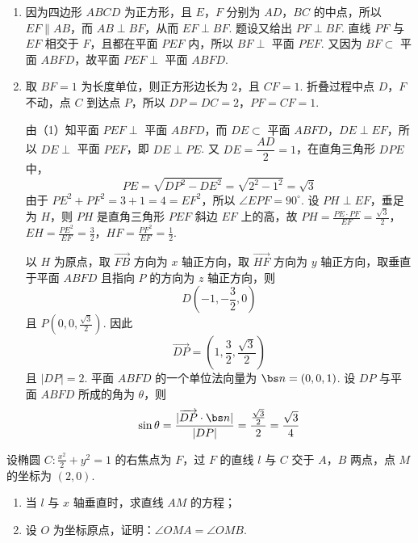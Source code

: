 \begin{solution}
\begin{enumerate}
\item 因为四边形 \(ABCD\) 为正方形，且 \(E\)，\(F\) 分别为 \(AD\)，\(BC\) 的中点，所以 \(EF\parallel AB\)，而 \(AB\perp BF\)，从而 \(EF\perp BF\). 题设又给出 \(PF\perp BF\). 直线 \(PF\) 与 \(EF\) 相交于 \(F\)，且都在平面 \(PEF\) 内，所以 \(BF\perp\) 平面 \(PEF\). 又因为 \(BF\subset\) 平面 \(ABFD\)，故平面 \(PEF\perp\) 平面 \(ABFD\).

\item 取 \(BF=1\) 为长度单位，则正方形边长为 \(2\)，且 \(CF=1\). 折叠过程中点 \(D\)，\(F\) 不动，点 \(C\) 到达点 \(P\)，所以 \(DP=DC=2\)，\(PF=CF=1\).

由（1）知平面 \(PEF\perp\) 平面 \(ABFD\)，而 \(DE\subset\) 平面 \(ABFD\)，\(DE\perp EF\)，所以 \(DE\perp\) 平面 \(PEF\)，即 \(DE\perp PE\). 又 \(DE=\dfrac{AD}{2}=1\)，在直角三角形 \(DPE\) 中，
\[
PE=\sqrt{DP^2-DE^2}=\sqrt{2^2-1^2}=\sqrt3
\]
由于 \(PE^2+PF^2=3+1=4=EF^2\)，所以 \(\angle EPF=90^\circ\). 设 \(PH\perp EF\)，垂足为 \(H\)，则 \(PH\) 是直角三角形 \(PEF\) 斜边 \(EF\) 上的高，故
\(PH=\frac{PE\cdot PF}{EF}=\frac{\sqrt3}{2}\)，\(EH=\frac{PE^2}{EF}=\frac32\)，\(HF=\frac{PF^2}{EF}=\frac12\).

以 \(H\) 为原点，取 \(\overrightarrow{FB}\) 方向为 \(x\) 轴正方向，取 \(\overrightarrow{HF}\) 方向为 \(y\) 轴正方向，取垂直于平面 \(ABFD\) 且指向 \(P\) 的方向为 \(z\) 轴正方向，则
\[
D\left(-1,-\frac32,0\right)
\]
且 \(P\left(0,0,\frac{\sqrt3}{2}\right)\). 因此
\[
\overrightarrow{DP}=\left(1,\frac32,\frac{\sqrt3}{2}\right)
\]
且 \(|DP|=2\).
平面 \(ABFD\) 的一个单位法向量为 \(\bs n=(0,0,1)\). 设 \(DP\) 与平面 \(ABFD\) 所成的角为 \(\theta\)，则
\[
\sin\theta=\frac{|\overrightarrow{DP}\cdot\bs n|}{|DP|}=\frac{\frac{\sqrt3}{2}}{2}=\frac{\sqrt3}{4}
\]
\end{enumerate}
\end{solution}

\begin{problem}
设椭圆 \(C:\frac{x^2}{2}+y^2=1\) 的右焦点为 \(F\)，过 \(F\) 的直线 \(l\) 与 \(C\) 交于 \(A\)，\(B\) 两点，点 \(M\) 的坐标为 \((2,0)\).

\begin{enumerate}
\item 当 \(l\) 与 \(x\) 轴垂直时，求直线 \(AM\) 的方程；
\item 设 \(O\) 为坐标原点，证明：\(\angle OMA=\angle OMB\).
\end{enumerate}
\end{problem}

